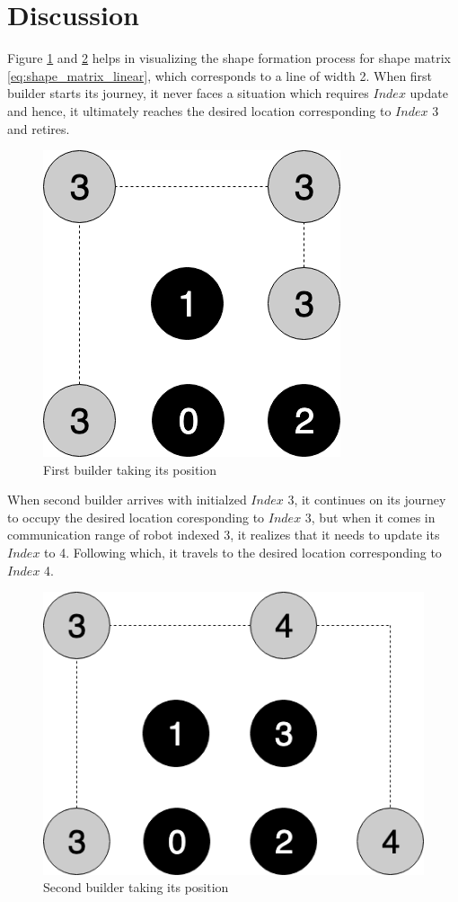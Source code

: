 \documentclass{report}[12pt]
\begin{document}
\section{Discussion}
Figure \ref{fig:shape_formation_process_1} and \ref{fig:shape_formation_process_2} helps in visualizing the shape formation process for shape matrix \eqref{eq:shape_matrix_linear}, which corresponds to a line of width 2. When first builder starts its journey, it never faces a situation which requires $Index$ update and hence, it ultimately reaches the desired location corresponding to $Index$ 3 and retires. 
\begin{figure}[H]
    \centering
    \includegraphics[scale=0.4]{"images/shape_formation_process_1"}
    \caption{First builder taking its position}
    \label{fig:shape_formation_process_1}
\end{figure}
When second builder arrives with initialzed $Index$ 3, it continues on its journey to occupy the desired location coresponding to $Index$ 3, but when it comes in communication range of robot indexed 3, it realizes that it needs to update its $Index$ to 4. Following which, it travels to the desired location corresponding to $Index$ 4.
\begin{figure}[H]
    \centering
    \includegraphics[scale=0.4]{"images/shape_formation_process_2"}
    \caption{Second builder taking its position}
    \label{fig:shape_formation_process_2}
\end{figure}
\end{document}
